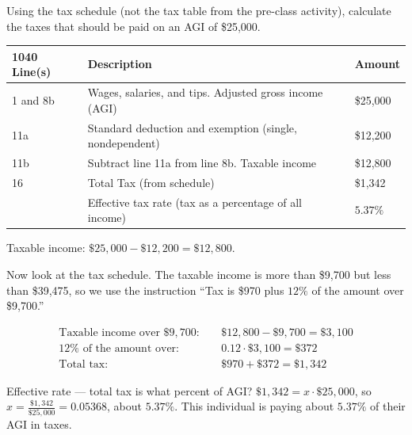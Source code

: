 \documentclass[12pt]{ximera}
\begin{document}
\begin{example}
Using the tax schedule (not the tax table from the pre-class activity), calculate the
taxes that should be paid on an AGI of \$25,000.

\begin{center}
\begin{tabular}{|l|l|l|}
\hline
1040 Line(s) & Description & Amount \\
\hline
1 and 8b & Wages, salaries, and tips. Adjusted gross income (AGI) & \$25,000 \\
\hline
11a & Standard deduction and exemption (single, nondependent) & \$12,200 \\
\hline
11b & Subtract line 11a from line 8b. Taxable income & \$12,800 \\
\hline
16 & Total Tax (from schedule) & \$1,342 \\
\hline
 & Effective tax rate (tax as a percentage of all income) & $5.37\%$ \\
\hline
\end{tabular}
\end{center}

Taxable income: $\$25{,}000 - \$12{,}200 = \$12{,}800$.

Now look at the tax schedule. The taxable income is more than \$9,700 but less than
\$39,475, so we use the instruction ``Tax is \$970 plus $12\%$ of the amount over
\$9,700.''

\[
\begin{aligned}
\text{Taxable income over } \$9{,}700: &\quad \$12{,}800 - \$9{,}700 = \$3{,}100 \\
12\% \text{ of the amount over}: &\quad 0.12 \cdot \$3{,}100 = \$372 \\
\text{Total tax}: &\quad \$970 + \$372 = \$1{,}342
\end{aligned}
\]

Effective rate --- total tax is what percent of AGI? $\$1{,}342 = x \cdot \$25{,}000$,
so $x = \frac{\$1{,}342}{\$25{,}000} = 0.05368$, about $5.37\%$. This individual is
paying about $5.37\%$ of their AGI in taxes.
\end{example}
\end{document}
